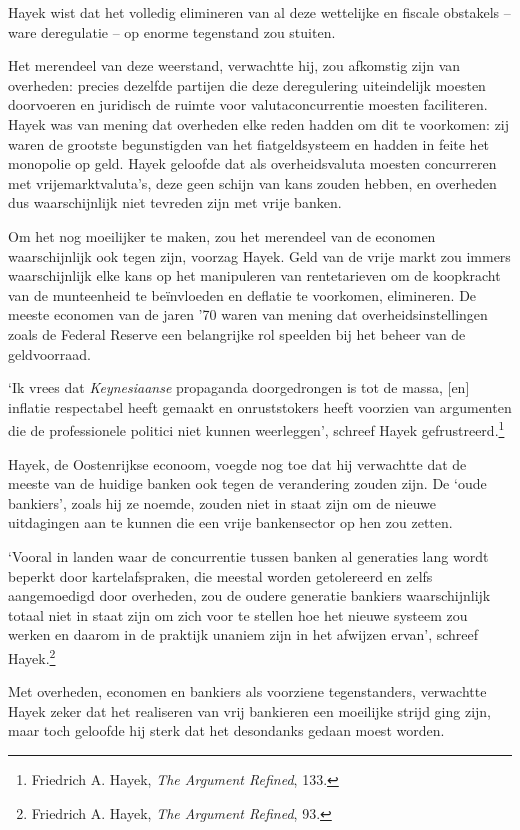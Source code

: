 \documentclass[
  a5paper,
  smalldemyvopaper,11pt,twoside,onecolumn,openright,extrafontsizes,
hidelinks]{memoir}
\begin{document}
Hayek wist dat het volledig elimineren van al deze wettelijke en fiscale
obstakels -- ware deregulatie -- op enorme tegenstand zou stuiten.

Het merendeel van deze weerstand, verwachtte hij, zou afkomstig zijn van
overheden: precies dezelfde partijen die deze deregulering uiteindelijk
moesten doorvoeren en juridisch de ruimte voor valutaconcurrentie
moesten faciliteren. Hayek was van mening dat overheden elke reden
hadden om dit te voorkomen: zij waren de grootste begunstigden van het
fiatgeldsysteem en hadden in feite het monopolie op geld. Hayek geloofde
dat als overheidsvaluta moesten concurreren met vrijemarktvaluta's, deze
geen schijn van kans zouden hebben, en overheden dus waarschijnlijk niet
tevreden zijn met vrije banken.

Om het nog moeilijker te maken, zou het merendeel van de economen
waarschijnlijk ook tegen zijn, voorzag Hayek. Geld van de vrije markt
zou immers waarschijnlijk elke kans op het manipuleren van rentetarieven
om de koopkracht van de munteenheid te beïnvloeden en deflatie te
voorkomen, elimineren. De meeste economen van de jaren '70 waren van
mening dat overheidsinstellingen zoals de Federal Reserve een
belangrijke rol speelden bij het beheer van de geldvoorraad.

`Ik vrees dat \emph{Keynesiaanse} propaganda doorgedrongen is tot de
massa, {[}en{]} inflatie respectabel heeft gemaakt en onruststokers
heeft voorzien van argumenten die de professionele politici niet kunnen
weerleggen', schreef Hayek gefrustreerd.\footnote{Friedrich A. Hayek,
  \emph{The Argument Refined}, 133.}

Hayek, de Oostenrijkse econoom, voegde nog toe dat hij verwachtte dat de
meeste van de huidige banken ook tegen de verandering zouden zijn. De
`oude bankiers', zoals hij ze noemde, zouden niet in staat zijn om de
nieuwe uitdagingen aan te kunnen die een vrije bankensector op hen zou
zetten.

`Vooral in landen waar de concurrentie tussen banken al generaties lang
wordt beperkt door kartelafspraken, die meestal worden getolereerd en
zelfs aangemoedigd door overheden, zou de oudere generatie bankiers
waarschijnlijk totaal niet in staat zijn om zich voor te stellen hoe het
nieuwe systeem zou werken en daarom in de praktijk unaniem zijn in het
afwijzen ervan', schreef Hayek.\footnote{Friedrich A. Hayek, \emph{The
  Argument Refined}, 93.}

Met overheden, economen en bankiers als voorziene tegenstanders,
verwachtte Hayek zeker dat het realiseren van vrij bankieren een
moeilijke strijd ging zijn, maar toch geloofde hij sterk dat het
desondanks gedaan moest worden.
\end{document}
